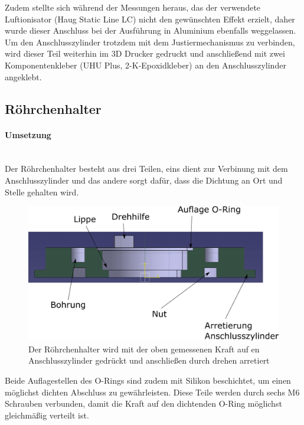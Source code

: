 Zudem stellte sich während der Messungen heraus, das der verwendete Luftionisator (Haug Static Line LC) nicht den gewünschten Effekt erzielt, daher wurde dieser Anschluss bei der Ausführung in Aluminium ebenfalls weggelassen. Um den Anschlusszylinder trotzdem mit dem Justiermechanismus zu verbinden, wird dieser Teil weiterhin im 3D Drucker gedruckt und anschließend mit zwei Komponentenkleber (UHU Plus, 2-K-Epoxidkleber) an den Anschlusszylinder angeklebt.


\subsection{Röhrchenhalter}

\paragraph{Umsetzung}

\hfill \\

Der Röhrchenhalter besteht aus drei Teilen, eins dient zur Verbinung mit dem Anschlusszylinder und das andere sorgt dafür, dass die Dichtung an Ort und Stelle gehalten wird. 

\begin{figure}[h]
	\begin{center}
		\includegraphics[scale=0.5]{Schnitt_Roehrchenhalter.png}
		\caption[Schnitt Röhrchenhalter]{Der Röhrchenhalter wird mit der oben gemessenen Kraft auf en Anschlusszylinder gedrückt und anschließen durch drehen arretiert}
	\end{center}
\end{figure}

Beide Auflagestellen des O-Rings sind zudem mit Silikon beschichtet, um einen möglichst dichten Abschluss zu gewährleisten.
Diese Teile werden durch sechs M6 Schrauben verbunden, damit die Kraft auf den dichtenden O-Ring möglichst gleichmäßig verteilt ist. \\

